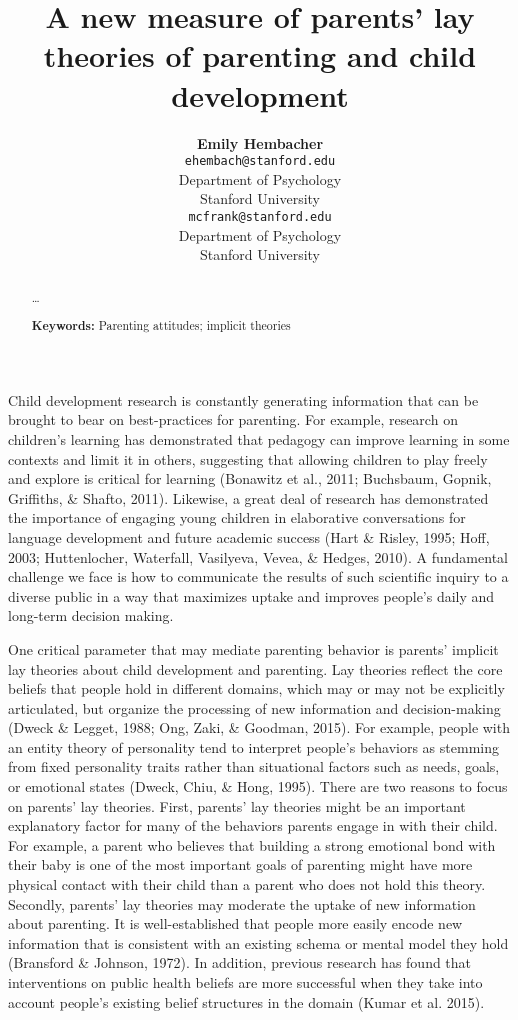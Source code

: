\documentclass[10pt, letterpaper]{article}
\title{A new measure of parents' lay theories of parenting and child
development}
\author{{\large \bf Emily Hembacher} \\ \texttt{ehembach@stanford.edu} \\ Department of Psychology \\ Stanford University \And {\large \bf Michael C. Frank} \\ \texttt{mcfrank@stanford.edu} \\ Department of Psychology \\ Stanford University}
\begin{document}
\maketitle

\begin{abstract}
\ldots{}

\textbf{Keywords:}
Parenting attitudes; implicit theories
\end{abstract}

Child development research is constantly generating information that can
be brought to bear on best-practices for parenting. For example,
research on children's learning has demonstrated that pedagogy can
improve learning in some contexts and limit it in others, suggesting
that allowing children to play freely and explore is critical for
learning (Bonawitz et al., 2011; Buchsbaum, Gopnik, Griffiths, \&
Shafto, 2011). Likewise, a great deal of research has demonstrated the
importance of engaging young children in elaborative conversations for
language development and future academic success (Hart \& Risley, 1995;
Hoff, 2003; Huttenlocher, Waterfall, Vasilyeva, Vevea, \& Hedges, 2010).
A fundamental challenge we face is how to communicate the results of
such scientific inquiry to a diverse public in a way that maximizes
uptake and improves people's daily and long-term decision making.

One critical parameter that may mediate parenting behavior is parents'
implicit lay theories about child development and parenting. Lay
theories reflect the core beliefs that people hold in different domains,
which may or may not be explicitly articulated, but organize the
processing of new information and decision-making (Dweck \& Legget,
1988; Ong, Zaki, \& Goodman, 2015). For example, people with an entity
theory of personality tend to interpret people's behaviors as stemming
from fixed personality traits rather than situational factors such as
needs, goals, or emotional states (Dweck, Chiu, \& Hong, 1995). There
are two reasons to focus on parents' lay theories. First, parents' lay
theories might be an important explanatory factor for many of the
behaviors parents engage in with their child. For example, a parent who
believes that building a strong emotional bond with their baby is one of
the most important goals of parenting might have more physical contact
with their child than a parent who does not hold this theory. Secondly,
parents' lay theories may moderate the uptake of new information about
parenting. It is well-established that people more easily encode new
information that is consistent with an existing schema or mental model
they hold (Bransford \& Johnson, 1972). In addition, previous research
has found that interventions on public health beliefs are more
successful when they take into account people's existing belief
structures in the domain (Kumar et al. 2015).
\end{document}

